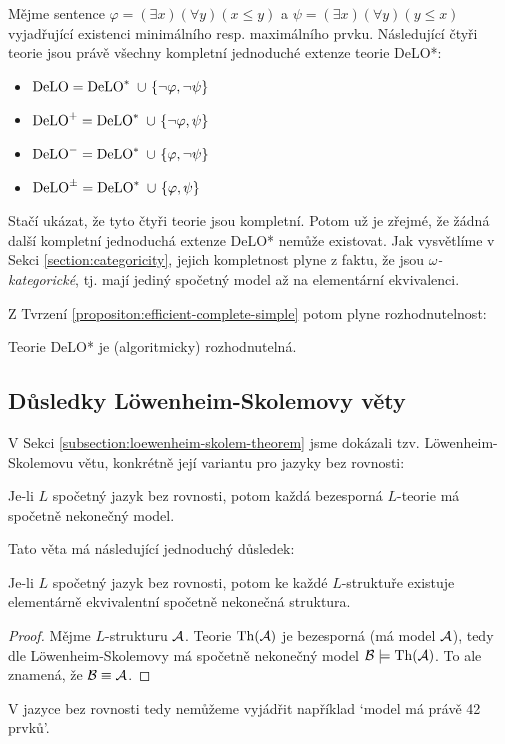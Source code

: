 \begin{proposition}
Mějme sentence $\varphi=(\exists x)(\forall y)(x\leq y)$ a $\psi=(\exists x)(\forall y)(y\leq x)$ vyjadřující existenci minimálního resp. maximálního prvku. Následující čtyři teorie jsou právě všechny kompletní jednoduché extenze teorie DeLO*:
\begin{itemize}
    \item $\operatorname{DeLO} = \operatorname{DeLO}^*\ \cup \ \{\neg\varphi
    ,\neg\psi\}$
    \item $\DeLO^+ = \DeLO^*\ \cup \ \{\neg\varphi
    ,\psi\}$
    \item $\operatorname{DeLO}^- = \operatorname{DeLO}^*\ \cup \ \{\varphi
    ,\neg\psi\}$
    \item $\operatorname{DeLO}^\pm = \operatorname{DeLO}^*\ \cup \ \{\varphi
    ,\psi\}$        
\end{itemize}
\end{proposition}

Stačí ukázat, že tyto čtyři teorie jsou kompletní. Potom už je zřejmé, že žádná další kompletní jednoduchá extenze DeLO* nemůže existovat. Jak vysvětlíme v Sekci \ref{section:categoricity}, jejich kompletnost plyne z faktu, že jsou \emph{$\omega$-kategorické}, tj. mají jediný spočetný model až na elementární ekvivalenci. 

Z Tvrzení \ref{propositon:efficient-complete-simple} potom plyne rozhodnutelnost:

\begin{corollary}
    Teorie DeLO* je (algoritmicky) rozhodnutelná.
\end{corollary}


\subsection{Důsledky Löwenheim-Skolemovy věty}

V Sekci \ref{subsection:loewenheim-skolem-theorem} jsme dokázali tzv. Löwenheim-Skolemovu větu, konkrétně její variantu pro jazyky bez rovnosti:

\begin{theorem-unnumbered}
    Je-li $L$ spočetný jazyk bez rovnosti, potom každá bezesporná $L$-teorie má spočetně nekonečný model.
\end{theorem-unnumbered}

Tato věta má následující jednoduchý důsledek:

\begin{corollary}\label{corollary:loewenheim-skolem-without-equality}
    Je-li $L$ spočetný jazyk bez rovnosti, potom ke každé $L$-struktuře existuje elementárně ekvivalentní spočetně nekonečná struktura.
\end{corollary}
\begin{proof}
    Mějme $L$-strukturu $\mathcal{A}$. Teorie $\operatorname{Th}(\mathcal{A})$ je bezesporná (má model $\mathcal{A}$), tedy dle Löwenheim-Skolemovy má spočetně nekonečný model $\mathcal{B}\models\operatorname{Th}(\mathcal{A})$. To ale znamená, že $\mathcal{B}\equiv\mathcal{A}$.
\end{proof}
V jazyce bez rovnosti tedy nemůžeme vyjádřit například `model má právě 42 prvků'.

